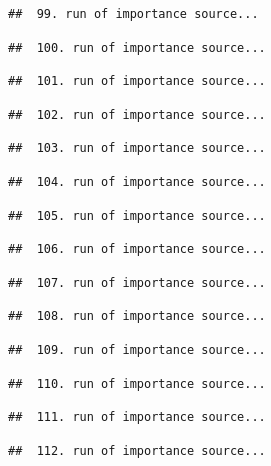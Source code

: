 \documentclass[
]{article}
\begin{document}
\begin{verbatim}
##  99. run of importance source...
\end{verbatim}

\begin{verbatim}
##  100. run of importance source...
\end{verbatim}

\begin{verbatim}
##  101. run of importance source...
\end{verbatim}

\begin{verbatim}
##  102. run of importance source...
\end{verbatim}

\begin{verbatim}
##  103. run of importance source...
\end{verbatim}

\begin{verbatim}
##  104. run of importance source...
\end{verbatim}

\begin{verbatim}
##  105. run of importance source...
\end{verbatim}

\begin{verbatim}
##  106. run of importance source...
\end{verbatim}

\begin{verbatim}
##  107. run of importance source...
\end{verbatim}

\begin{verbatim}
##  108. run of importance source...
\end{verbatim}

\begin{verbatim}
##  109. run of importance source...
\end{verbatim}

\begin{verbatim}
##  110. run of importance source...
\end{verbatim}

\begin{verbatim}
##  111. run of importance source...
\end{verbatim}

\begin{verbatim}
##  112. run of importance source...
\end{verbatim}
\end{document}
